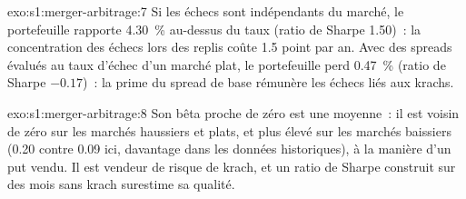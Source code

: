 \begin{solution}{exo:s1:merger-arbitrage:7}
Si les échecs sont indépendants du marché, le portefeuille rapporte 4.30~\% au-dessus du taux (ratio de Sharpe 1.50)~: la concentration des échecs lors des replis coûte 1.5 point par
an. Avec des spreads évalués au taux d'échec d'un marché plat, le portefeuille perd 0.47~\% (ratio de Sharpe $-0.17$)~: la prime du spread de base rémunère les
échecs liés aux krachs.
\end{solution}

\begin{solution}{exo:s1:merger-arbitrage:8}
Son bêta proche de zéro est une moyenne~: il est voisin de zéro sur les marchés haussiers et plats, et plus élevé sur les marchés baissiers (0.20 contre 0.09 ici, davantage dans les
données historiques), à la manière d'un put vendu. Il est vendeur de risque de krach, et un ratio de Sharpe construit sur des mois sans krach surestime sa qualité.
\end{solution}

